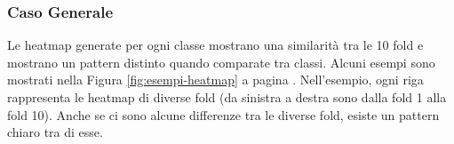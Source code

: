 \subsubsection{Caso Generale}
Le heatmap generate per ogni classe mostrano una similarità tra le 10 fold e mostrano un pattern distinto
quando comparate tra classi. Alcuni esempi sono mostrati nella Figura \ref{fig:esempi-heatmap} a
pagina \pageref{fig:esempi-heatmap}. 
Nell'esempio, ogni riga rappresenta le heatmap di diverse fold (da sinistra a destra sono dalla fold 1 alla fold 10).
Anche se ci sono alcune differenze tra le diverse fold, esiste un pattern chiaro tra di esse.
\begin{figure}[htpb!]
    \centering
     \hfill
     \hfill %
     \hfill %
     \hfill %
     \hfill %

\end{figure}
